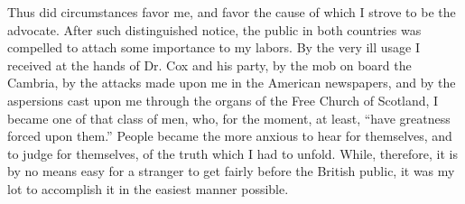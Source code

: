 Thus did circumstances favor me, and favor the cause of which I strove
to be the advocate. After such distinguished notice, the public in both
countries was compelled to attach some importance to my labors. By the
very ill usage I received at the hands of Dr. Cox and his party, by the
mob on board the Cambria, by the attacks made upon me in the American
newspapers, and by the aspersions cast upon me through the organs of the
Free Church of Scotland, I became one of that class of men, who, for the
moment, at least, ``have greatness forced upon them.'' People became the
more anxious to hear for themselves, and to judge for themselves, of the
truth which I had to unfold. While, therefore, it is by no means easy
for a stranger to get fairly before the British public, it was my lot to
accomplish it in the easiest manner possible.

